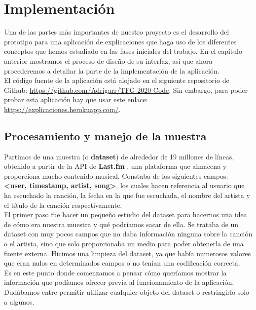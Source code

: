\chapter{Implementación}
\label{cap:implementacion}

Una de las partes más importantes de nuestro proyecto es el desarrollo del prototipo para una aplicación de explicaciones que haga uso de los diferentes conceptos que hemos estudiado en las fases iniciales del trabajo. En el capítulo anterior mostramos el proceso de diseño de su interfaz, así que ahora procederemos a detallar la parte de la implementación de la aplicación.\\

El código fuente de la aplicación está alojado en el siguiente repositorio de Github: \url{https://github.com/Adrigarr/TFG-2020-Code}. Sin embargo, para poder probar esta aplicación hay que usar este enlace: \url{https://explicaciones.herokuapp.com/}.\\


\section{Procesamiento y manejo de la muestra}

Partimos de una muestra (o \textbf{dataset}) de alrededor de 19 millones de líneas, obtenido a partir de la API de \textbf{Last.fm} \cite{lastfm}, una plataforma que almacena y proporciona mucho contenido musical. Constaba de los siguientes campos: \textbf{<user, timestamp, artist, song>}, los cuales hacen referencia al usuario que ha escuchado la canción, la fecha en la que fue escuchada, el nombre del artista y el título de la canción respectivamente.\\

El primer paso fue hacer un pequeño estudio del dataset para hacernos una idea de cómo era nuestra muestra y qué podríamos sacar de ella. Se trataba de un dataset con muy pocos campos que no daba información ninguna sobre la canción o el artista, sino que solo proporcionaba un medio para poder obtenerla de una fuente externa. Hicimos una limpieza del dataset, ya que había numerosos valores que eran nulos en determinados campos o no tenían una codificación correcta.\\

Es en este punto donde comenzamos a pensar cómo queríamos mostrar la información que podíamos ofrecer previa al funcionamiento de la aplicación. Dudábamos entre permitir utilizar cualquier objeto del dataset o restringirlo solo a algunos.\\

